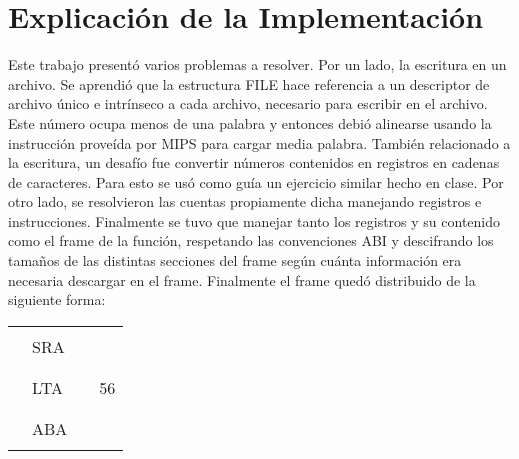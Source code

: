 \documentclass[a4paper,10pt]{article}
\begin{document}
\section{Explicaci\'on de la Implementaci\'on}
Este trabajo present\'o varios problemas a resolver. 
Por un lado, la escritura en un archivo. Se aprendi\'o que la estructura FILE hace referencia a un 
descriptor de archivo \'unico e intr\'inseco a cada archivo, necesario para escribir en el archivo. 
Este n\'umero ocupa menos de una palabra y entonces debi\'o alinearse usando la instrucci\'on 
prove\'ida por MIPS para cargar media palabra. 
También relacionado a la escritura, un desaf\'io fue convertir n\'umeros contenidos en registros en 
cadenas de caracteres. Para esto se us\'o como gu\'ia un ejercicio similar hecho en clase. 
Por otro lado, se resolvieron las cuentas propiamente dicha manejando registros e instrucciones. 
Finalmente se tuvo que manejar tanto los registros y su contenido como el frame de la funci\'on, 
respetando las convenciones ABI y descifrando los tamaños de las distintas secciones del frame seg\'un 
cu\'anta informaci\'on era necesaria descargar en el frame.
Finalmente el frame qued\'o distribuido de la siguiente forma:


\begin{center}
\begin{tabular}{ r | p{1cm} | c | l }
  \cline{2-2}              
   & & & \\        
   & SRA & & \\ 
   & & & \\ \cline{2-2}
   & & & \\ 
   & LTA & &  56 \\ 
   & & & \\ \cline{2-2}
   & & & \\ 
   & ABA & &\\
   & & & \\ 
  \cline{2-2}
\end{tabular}
\end{center}
\end{document}
